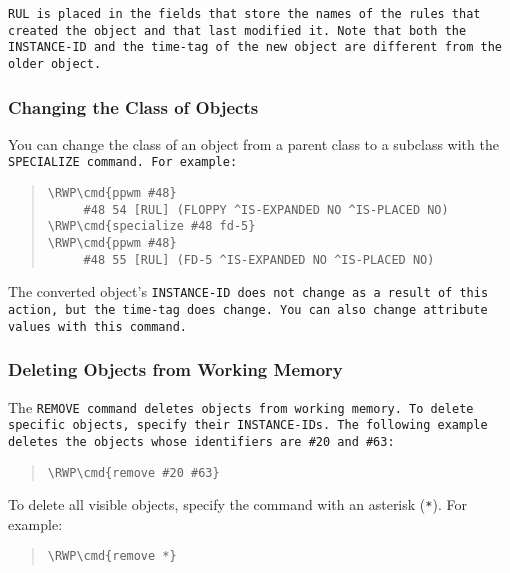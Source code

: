 \tt{RUL} is placed in the fields that store the names of the rules
that created the object and that last modified it. Note that both the
\tt{INSTANCE-ID} and the time-tag of the new object are different from
the older object.

\subsubsection{Changing the Class of Objects}

You can change the class of an object from a parent class to a
subclass with the \tt{SPECIALIZE} command. For example:

\begin{quote}
\begin{Verbatim}[commandchars=\\\{\}]
\RWP\cmd{ppwm #48}
     #48 54 [RUL] (FLOPPY ^IS-EXPANDED NO ^IS-PLACED NO)
\RWP\cmd{specialize #48 fd-5}
\RWP\cmd{ppwm #48}
     #48 55 [RUL] (FD-5 ^IS-EXPANDED NO ^IS-PLACED NO)
\end{Verbatim}
\end{quote}

\begin{note}
  The converted object's \tt{INSTANCE-ID} does not change as a result
  of this action, but the time-tag does change. You can also change
  attribute values with this command.
\end{note}

\subsubsection{Deleting Objects from Working Memory}

The \tt{REMOVE} command deletes objects from working memory. To delete
specific objects, specify their \tt{INSTANCE-ID}s. The following
example deletes the objects whose identifiers are \verb|#20| and
\verb|#63|:

\begin{quote}
\begin{Verbatim}[commandchars=\\\{\}]
\RWP\cmd{remove #20 #63}
\end{Verbatim}
\end{quote}

To delete all visible objects, specify the command with an asterisk
(\verb|*|). For example:

\begin{quote}
\begin{Verbatim}[commandchars=\\\{\}]
\RWP\cmd{remove *}
\end{Verbatim}
\end{quote}

